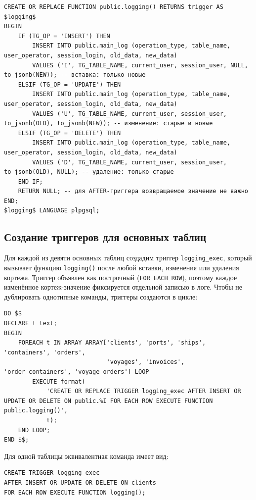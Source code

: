 \documentclass[a4paper,14pt]{article}
\begin{document}
\begin{lstlisting}
CREATE OR REPLACE FUNCTION public.logging() RETURNS trigger AS $logging$
BEGIN
    IF (TG_OP = 'INSERT') THEN
        INSERT INTO public.main_log (operation_type, table_name, user_operator, session_login, old_data, new_data)
        VALUES ('I', TG_TABLE_NAME, current_user, session_user, NULL, to_jsonb(NEW)); -- вставка: только новые
    ELSIF (TG_OP = 'UPDATE') THEN
        INSERT INTO public.main_log (operation_type, table_name, user_operator, session_login, old_data, new_data)
        VALUES ('U', TG_TABLE_NAME, current_user, session_user, to_jsonb(OLD), to_jsonb(NEW)); -- изменение: старые и новые
    ELSIF (TG_OP = 'DELETE') THEN
        INSERT INTO public.main_log (operation_type, table_name, user_operator, session_login, old_data, new_data)
        VALUES ('D', TG_TABLE_NAME, current_user, session_user, to_jsonb(OLD), NULL); -- удаление: только старые
    END IF;
    RETURN NULL; -- для AFTER-триггера возвращаемое значение не важно
END;
$logging$ LANGUAGE plpgsql;
\end{lstlisting}

\subsection{Создание триггеров для основных таблиц}
Для каждой из девяти основных таблиц создадим триггер \texttt{logging\_exec}, который вызывает функцию \texttt{logging()} после любой вставки, изменения или удаления кортежа. Триггер объявлен как построчный (\texttt{FOR EACH ROW}), поэтому каждое изменённое кортеж-значение фиксируется отдельной записью в логе. Чтобы не дублировать однотипные команды, триггеры создаются в цикле:

\begin{lstlisting}
DO $$
DECLARE t text;
BEGIN
    FOREACH t IN ARRAY ARRAY['clients', 'ports', 'ships', 'containers', 'orders',
                             'voyages', 'invoices', 'order_containers', 'voyage_orders'] LOOP
        EXECUTE format(
            'CREATE OR REPLACE TRIGGER logging_exec AFTER INSERT OR UPDATE OR DELETE ON public.%I FOR EACH ROW EXECUTE FUNCTION public.logging()',
            t);
    END LOOP;
END $$;
\end{lstlisting}

Для одной таблицы эквивалентная команда имеет вид:

\begin{lstlisting}
CREATE TRIGGER logging_exec
AFTER INSERT OR UPDATE OR DELETE ON clients
FOR EACH ROW EXECUTE FUNCTION logging();
\end{lstlisting}
\end{document}
